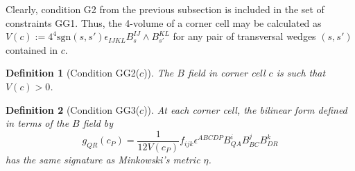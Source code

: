 \documentclass{article}
\newtheorem{theorem}{Theorem}
\newtheorem{definition}{Definition}
\begin{document}
Clearly, condition G2 from the previous subsection is included in the set of constraints GG1. Thus, the 4-volume of a corner cell may be calculated as $V(c):= 4^4 \text{sgn}(s,s')\epsilon_{IJKL}B_s^{IJ}\wedge B_{s'}^{KL}$ for any pair of transversal wedges $(s,s')$ contained in $c$. 
%
%
%
%
%
%
%
%
%
%
%

%
\begin{definition}[Condition GG2($c$)]\label{GG2}
The $B$ field in corner cell $c$ is such that $V(c) > 0$. 
\end{definition}

\begin{definition}[Condition GG3($c$)]\label{GG3}
	At each corner cell, 
	the bilinear form defined in terms of the $B$ field by 
\[
	g_{QR}(c_{P}) =  
	\frac{1}{12 V(c_{P})}f_{ijk} \epsilon^{ABCDP} B^i_{QA} B^j_{BC} B^k_{DR}
\]
has the same signature as Minkowski's metric $\eta$. 
\end{definition}
\end{document}
